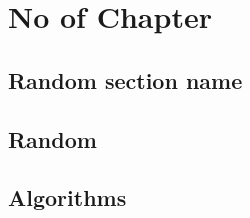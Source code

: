 \documentclass[a4paper,12pt]{report}
\date{09/12/2023}
\begin{document}
    \tableofcontents
    \pagebreak

    \chapter{No of Chapter}
    \section{Random section name}

    \section{Random}
    \section{Algorithms}
\end{document}
